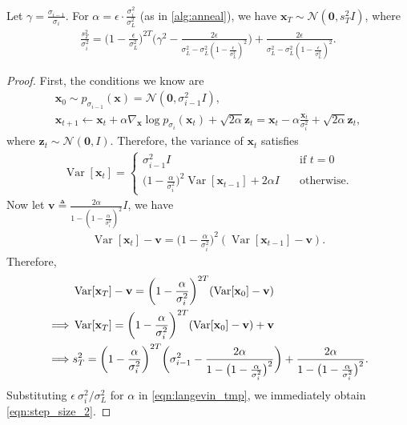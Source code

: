 \documentclass{article}
\newcommand{\mbf}[1]{\mathbf{#1}}
\newcommand{\mcal}{\mathcal}
\newenvironment{customprop}[1]
{\renewcommand\theinnercustomprop{#1}\innercustomprop}
{\endinnercustomprop}
\newcommand{\bfx}{\mathbf{x}}
\newcommand{\bfz}{\mathbf{z}}
\newcommand{\bfzero}{\mathbf{0}}
\begin{document}
\begin{customprop}{\ref{prop:langevin}}
Let $\gamma = \frac{\sigma_{i-1}}{\sigma_i}$. For $\alpha = \epsilon\cdot  \frac{\sigma_i^2}{\sigma_L^2}$ (as in \cref{alg:anneal}), we have $\bfx_T \sim \mcal{N}(\bfzero, s^2_T I)$, where
\begin{align}
    \frac{s^2_T}{\sigma_i^2} =  \bigg( 1 - \frac{\epsilon}{\sigma_L^2} \bigg)^{2T}\Bigg( \gamma^2 - \frac{2\epsilon}{\sigma_L^2 - \sigma_L^2 \left(1 - \frac{\epsilon}{\sigma_L^2} \right)^2} \Bigg) + \frac{2\epsilon}{\sigma_L^2 - \sigma_L^2 \left( 1 - \frac{\epsilon}{\sigma_L^2} \right)^2}.\label{eqn:step_size_2}
\end{align}
\end{customprop}

\begin{proof}
First, the conditions we know are
\begin{gather*}
    \bfx_0 \sim p_{\sigma_{i-1}}(\bfx) = \mcal{N}(\bfzero, \sigma_{i-1}^2 I),\\
    \bfx_{t+1} \gets \bfx_{t} + \alpha \nabla_\bfx \log p_{\sigma_i}(\bfx_t) + \sqrt{2\alpha} \bfz_t = \bfx_t -\alpha \frac{\bfx_t}{\sigma_i^2} + \sqrt{2\alpha} \bfz_t,
\end{gather*}
where $\bfz_t \sim \mcal{N}(\bfzero, I)$. Therefore, the variance of $\bfx_t$ satisfies
\begin{align*}
    \operatorname{Var}[\bfx_t] = \begin{cases}
        \sigma_{i-1}^2 I \quad & \text{if $t = 0$}\\
        \bigg(1 - \frac{\alpha}{\sigma_i^2} \bigg)^2\operatorname{Var}[\bfx_{t-1}] + 2\alpha I \quad & \text{otherwise}.
    \end{cases}
\end{align*}
Now let $\mbf{v} \triangleq \frac{2\alpha}{1 - \left( 1 - \frac{\alpha}{\sigma_i^2} \right)^2} I$, we have
\begin{align*}
    \operatorname{Var}[\bfx_{t}] - \mbf{v} = \bigg( 1 - \frac{\alpha}{\sigma_i^2} \bigg)^2(\operatorname{Var}[\bfx_{t-1}] - \mbf{v}).
\end{align*}
Therefore,
\begin{align}
    &\operatorname{Var}[\bfx_T] - \mbf{v} = \bigg( 1 - \frac{\alpha}{\sigma_i^2} \bigg)^{2T}(\operatorname{Var}[\bfx_{0}] - \mbf{v})\notag\\
    \implies & \operatorname{Var}[\bfx_T] = \bigg( 1 - \frac{\alpha}{\sigma_i^2} \bigg)^{2T}(\operatorname{Var}[\bfx_{0}] - \mbf{v}) + \mbf{v}\notag\\
    \implies & s_T^2 = \bigg( 1 - \frac{\alpha}{\sigma_i^2} \bigg)^{2T}\bigg(\sigma_{i-1}^2 - \frac{2\alpha}{1 - \big( 1 - \frac{\alpha}{\sigma_i^2} \big)^2}\bigg) + \frac{2\alpha}{1 - \big( 1 - \frac{\alpha}{\sigma_i^2} \big)^2}.\label{eqn:langevin_tmp}
\end{align}
Substituting $\epsilon ~\sigma_i^2 / \sigma_L^2$ for $\alpha$ in \cref{eqn:langevin_tmp}, we immediately obtain \cref{eqn:step_size_2}.
\end{proof}
\end{document}
